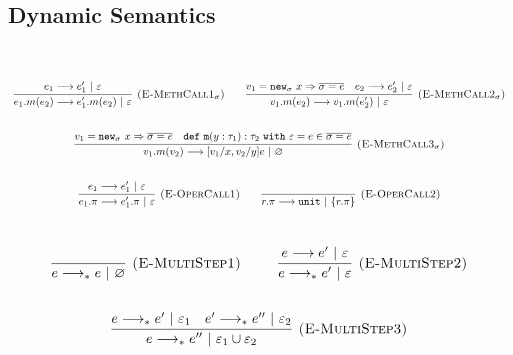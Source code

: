 \documentclass{llncs}
\newcommand{\keywadj}[1]{\mathtt{#1}}
\newcommand{\keyw}[1]{\keywadj{#1}~}
\begin{document}
\subsection{Dynamic Semantics}
~\\
\noindent
{}

\[
\begin{array}{c}

	\infer[\textsc{(E-MethCall1$_{\sigma}$)}]
		{e_1.m(e_2) \longrightarrow e_1'.m(e_2)~|~\varepsilon}
		{e_1 \longrightarrow e_1'~|~\varepsilon}

		~~~~~~

	\infer[\textsc{(E-MethCall2$_{\sigma}$)}]
		{v_1.m(e_2) \longrightarrow v_1.m(e_2')~|~\varepsilon}
		{v_1 = \keywadj{new}_{\sigma}~x \Rightarrow \overline{\sigma = e} & e_2 \longrightarrow e_2'~|~\varepsilon}\\[5ex]
				
		
	\infer[\textsc{(E-MethCall3$_{\sigma}$)}]
		{v_1.m(v_2)
			\longrightarrow
		 [v_1/x, v_2/y]e~|~\varnothing}
  		{v_1 = \keywadj{new}_{\sigma}~x \Rightarrow \overline{\sigma = e} & \keywadj{def~m}(y: \tau_1) : \tau_2~\keyw{with} \varepsilon = e \in \overline {\sigma = e}} \\[5ex]

	\infer[\textsc{(E-OperCall1)}]
		{e_1.\pi
			\longrightarrow
		 e_1'.\pi~|~\varepsilon}
		{e_1 \longrightarrow e_1'~|~\varepsilon}
~~~~~~

			\infer[\textsc{(E-OperCall2)}]
		{r.\pi
			\longrightarrow
		 \keywadj{unit}~|~\{r.\pi\}}
		{} \\[5ex]
			
\end{array}
\]
\noindent
{}

\[
\begin{array}{c}

	\infer[\textsc{(E-MultiStep1)}]
	{e \longrightarrow_* e~|~\varnothing}
	{} ~~~~~~~~
	
	\infer[\textsc{(E-MultiStep2)}]
	{e \longrightarrow_* e'~|~\varepsilon}
	{e \longrightarrow e'~|~\varepsilon} \\[5ex]

	\infer[\textsc{(E-MultiStep3)}]
	{e \longrightarrow_* e''~|~\varepsilon_1 \cup \varepsilon_2}
	{e \longrightarrow_* e'~|~\varepsilon_1 & e' \longrightarrow_* e''~|~\varepsilon_2}

\end{array}
\]
\end{document}
